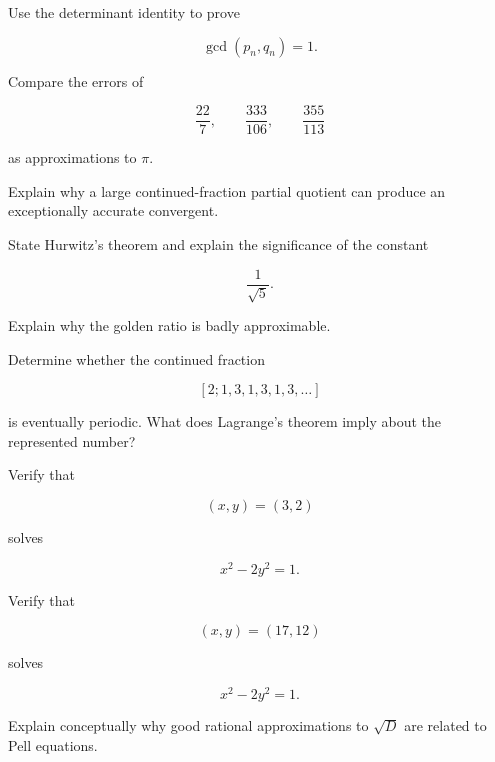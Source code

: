\begin{exercise}[2]
Use the determinant identity to prove

\[ \gcd(p_n,q_n)=1. \]
\end{exercise}

\begin{exercise}[2]
Compare the errors of

\[ \frac{22}{7},\qquad\frac{333}{106},\qquad\frac{355}{113} \]

as approximations to \(\pi\).
\end{exercise}

\begin{exercise}[2]
Explain why a large continued-fraction partial quotient can produce an
exceptionally accurate convergent.
\end{exercise}

\begin{exercise}[2]
State Hurwitz's theorem and explain the significance of the constant

\[ \frac1{\sqrt5}. \]
\end{exercise}

\begin{exercise}[2]
Explain why the golden ratio is badly approximable.
\end{exercise}

\begin{exercise}[2]
Determine whether the continued fraction

\[ [2;1,3,1,3,1,3,\ldots] \]

is eventually periodic.
What does Lagrange's theorem imply about the represented number?
\end{exercise}

\begin{exercise}[2]
Verify that

\[ (x,y)=(3,2) \]

solves

\[ x^2-2y^2=1. \]
\end{exercise}

\begin{exercise}[2]
Verify that

\[ (x,y)=(17,12) \]

solves

\[ x^2-2y^2=1. \]
\end{exercise}

\begin{exercise}[3]
Explain conceptually why good rational approximations to \(\sqrt D\) are
related to Pell equations.
\end{exercise}

